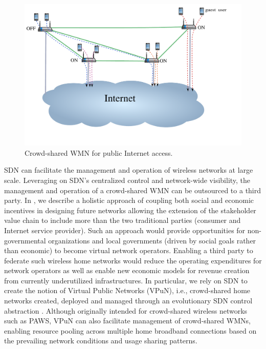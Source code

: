 \begin{figure}[t]
\begin{center}
\includegraphics[width=1\linewidth]{flow_redirection.pdf}  
\caption{Crowd-shared WMN for public Internet access.}
\label{fig:wmn}
\end{center}
\end{figure}

SDN can facilitate the management and operation of wireless networks at large scale. Leveraging on SDN's centralized control and network-wide visibility, the management and operation of a crowd-shared WMN can be outsourced to a third party. In \cite{EWSDN}, we describe a holistic approach of coupling both social and economic incentives in designing future networks allowing the extension of the stakeholder value chain to include more than the two traditional parties (consumer and Internet service provider). Such an approach would provide opportunities for non-governmental organizations and local governments (driven by social goals rather than economic) to become virtual network operators. Enabling a third party to federate such wireless home networks would reduce the operating expenditures for network operators as well as enable new economic models for revenue creation from currently underutilized infrastructures. In particular, we rely on SDN to create the notion of Virtual Public Networks (VPuN), i.e., crowd-shared home networks created, deployed and managed through an evolutionary SDN control abstraction \cite{EWSDN}. Although originally intended for crowd-shared wireless networks such as PAWS, VPuN can also facilitate management of crowd-shared WMNs, enabling resource pooling across multiple home broadband connections based on the prevailing network conditions and usage sharing patterns. 

